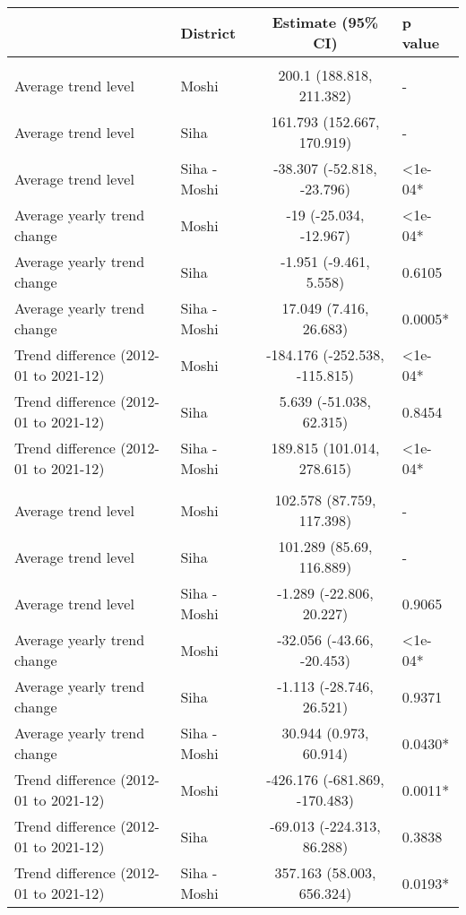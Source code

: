 \begingroup
\fontsize{12.0pt}{14.4pt}\selectfont
\begin{longtable}{l|lcl}
\toprule
 & District & Estimate (95\% CI) & p value \\ 
\midrule\addlinespace[2.5pt]
\multicolumn{4}{l}{Chronic Respiratory Disease} \\[2.5pt] 
\midrule\addlinespace[2.5pt]
Average trend level & Moshi & 200.1 (188.818, 211.382) & - \\ 
Average trend level & Siha & 161.793 (152.667, 170.919) & - \\ 
Average trend level & Siha - Moshi & -38.307 (-52.818, -23.796) & <1e-04* \\ 
Average yearly trend change & Moshi & -19 (-25.034, -12.967) & <1e-04* \\ 
Average yearly trend change & Siha & -1.951 (-9.461, 5.558) & 0.6105 \\ 
Average yearly trend change & Siha - Moshi & 17.049 (7.416, 26.683) & 0.0005* \\ 
Trend difference (2012-01 to 2021-12) & Moshi & -184.176 (-252.538, -115.815) & <1e-04* \\ 
Trend difference (2012-01 to 2021-12) & Siha & 5.639 (-51.038, 62.315) & 0.8454 \\ 
Trend difference (2012-01 to 2021-12) & Siha - Moshi & 189.815 (101.014, 278.615) & <1e-04* \\ 
\midrule\addlinespace[2.5pt]
\multicolumn{4}{l}{Caries} \\[2.5pt] 
\midrule\addlinespace[2.5pt]
Average trend level & Moshi & 102.578 (87.759, 117.398) & - \\ 
Average trend level & Siha & 101.289 (85.69, 116.889) & - \\ 
Average trend level & Siha - Moshi & -1.289 (-22.806, 20.227) & 0.9065 \\ 
Average yearly trend change & Moshi & -32.056 (-43.66, -20.453) & <1e-04* \\ 
Average yearly trend change & Siha & -1.113 (-28.746, 26.521) & 0.9371 \\ 
Average yearly trend change & Siha - Moshi & 30.944 (0.973, 60.914) & 0.0430* \\ 
Trend difference (2012-01 to 2021-12) & Moshi & -426.176 (-681.869, -170.483) & 0.0011* \\ 
Trend difference (2012-01 to 2021-12) & Siha & -69.013 (-224.313, 86.288) & 0.3838 \\ 
Trend difference (2012-01 to 2021-12) & Siha - Moshi & 357.163 (58.003, 656.324) & 0.0193* \\ 

\end{longtable}
